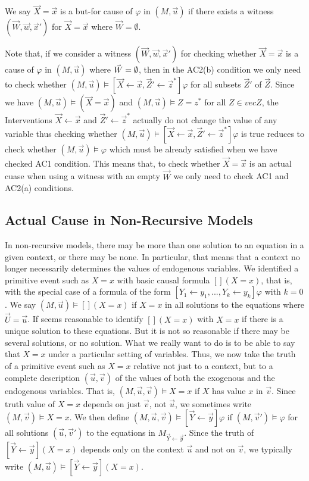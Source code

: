 \documentclass{article}
\begin{document}
\begin{definition}
    We say $\vec X = \vec x$ is a but-for cause of $\varphi$ in
    $(M,\vec u)$ if there exists a witness $(\vec W, \vec w, \vec x')$
    for $\vec X = \vec x$ where $\vec W = \emptyset $.
\end{definition}

Note that, if we consider a witness $(\vec W, \vec w, \vec x')$
for checking whether $\vec X = \vec x$ is a cause of $\varphi$
in $(M,\vec u)$ where $\vec W = \emptyset$, then in the AC2(b) condition
we only need to check whether $(M,\vec u) \vDash [\vec X \leftarrow \vec x, \vec Z' \leftarrow \vec z^*]\varphi$ for all subsets $\vec Z'$
of $\vec Z$.
Since we have $(M,\vec u) \vDash (\vec X = \vec x)$ and
$(M,\vec u) \vDash Z = z^*$ for all $Z \in vec Z$,
the Interventions $\vec X \leftarrow \vec x$ and
$\vec Z ' \leftarrow \vec z^*$ actually do not change the value of
any variable thus checking whether
$(M,\vec u) \vDash [\vec X \leftarrow \vec x, \vec Z' \leftarrow \vec z^*]\varphi$ is true
reduces to check whether $(M,\vec u) \vDash \varphi$
which must be already satisfied when we have checked AC1 condition.
This means that, to check whether $\vec X = \vec x$ is an actual cuase when using a witness with an empty $\vec W$
we only need to check AC1 and AC2(a) conditions.

\subsection{Actual Cause in Non-Recursive Models}

\newcommand{\la}{\leftarrow}
In non-recursive models, there may be more than one solution to
an equation in a given context, or there may be none.
In particular, that means that a context no longer necessarily
determines the values of endogenous variables.
We identified a primitive event such as $X = x$ with basic causal formula $[](X=x)$, that is, with the special case of a formula
of the form $[Y_1 \la y_1,...,Y_k\la y_k ]\varphi$ with $k =0 $.
We say $(M,\vec u) \vDash [] (X = x)$ if $X=x$ in all solutions
to the equations where $\vec U = \vec u$.
If seems reasonable to identify $[](X=x)$ with $X=x$ if there
is a unique solution to these equations.
But it is not so reasonable if there may be several solutions,
or no solution.
What we really want to do is to be able to say that $X=x$ under
a particular setting of variables.
Thus, we now take the truth of a primitive event such as $X=x$
relative not just to a context, but to a complete description
$(\vec u, \vec v)$ of the values of both the exogenous and
the endogenous variables.
That is, $(M,\vec u,\vec v) \vDash X =x$ if $X$ has value $x$ in $\vec v$.
Since truth value of $X=x$ depends on just $\vec v$, not $\vec u$,
we sometimes write $(M,\vec v) \vDash X =x$.
We then define $(M,\vec u, \vec v) \vDash[\vec Y \la \vec y]\varphi$ if $(M,\vec v') \vDash \varphi$ for all solutions
$(\vec u, \vec v')$ to the equations in $M_{\vec Y \la \vec y}$.
Since the truth of $[\vec Y \la \vec y](X=x)$ depends only on the
context $\vec u$ and not on $\vec v$, we typically write $(M,\vec u) \vDash[ \vec Y \la \vec y](X=x)$.
\end{document}
